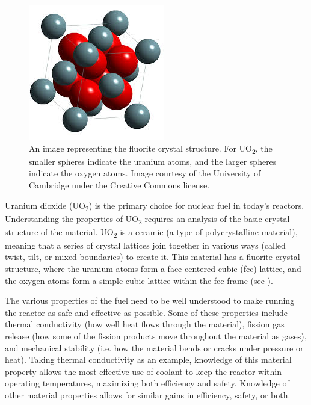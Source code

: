 \documentclass[12pt]{report}
\begin{document}
\begin{figure}
\vspace{-20pt}
\centering
\includegraphics[scale=0.7]{Images/UO2}
\vspace{-10pt}
\caption[Example of the fluorite crystal structure.]{\label{fig:uo2Lattice}An image representing the fluorite crystal structure.  For UO\textsubscript{2}, the smaller spheres indicate the uranium atoms, and the larger spheres indicate the oxygen atoms.  Image courtesy of the University of Cambridge under the Creative Commons license.}
\vspace{-10pt}
\end{figure}
Uranium dioxide (UO\textsubscript{2}) is the primary choice for nuclear fuel in today's reactors.\cite{uraniumInfo}  Understanding the properties of UO\textsubscript{2} requires an analysis of the basic crystal structure of the material.  UO\textsubscript{2} is a ceramic (a type of polycrystalline material), meaning that a series of crystal lattices join together in various ways (called twist, tilt, or mixed boundaries) to create it.  This material has a fluorite crystal structure, where the uranium atoms form a face-centered cubic (fcc) lattice, and the oxygen atoms form a simple cubic lattice within the fcc frame (see ).

The various properties of the fuel need to be well understood to make running the reactor as safe and effective as possible.  Some of these properties include thermal conductivity (how well heat flows through the material), fission gas release (how some of the fission products move throughout the material as gases), and mechanical stability (i.e. how the material bends or cracks under pressure or heat).  Taking thermal conductivity as an example, knowledge of this material property allows the most effective use of coolant to keep the reactor within operating temperatures, maximizing both efficiency and safety.  Knowledge of other material properties allows for similar gains in efficiency, safety, or both.
\end{document}
